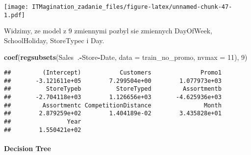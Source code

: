 \documentclass[]{article}
\newenvironment{Shaded}{\begin{snugshade}}{\end{snugshade}}
\newcommand{\DataTypeTok}[1]{\textcolor[rgb]{0.13,0.29,0.53}{#1}}
\newcommand{\DecValTok}[1]{\textcolor[rgb]{0.00,0.00,0.81}{#1}}
\newcommand{\KeywordTok}[1]{\textcolor[rgb]{0.13,0.29,0.53}{\textbf{#1}}}
\newcommand{\NormalTok}[1]{#1}
\newcommand{\OperatorTok}[1]{\textcolor[rgb]{0.81,0.36,0.00}{\textbf{#1}}}
\newcommand{\StringTok}[1]{\textcolor[rgb]{0.31,0.60,0.02}{#1}}
\let\oldparagraph\paragraph
\renewcommand{\paragraph}[1]{\oldparagraph{#1}\mbox{}}
\begin{document}
\begin{Shaded}
\end{Shaded}

\texttt{[image: ITMagination\_zadanie\_files/figure-latex/unnamed-chunk-47-1.pdf]}

Widzimy, ze model z 9 zmiennymi pozbyl sie zmiennych DayOfWeek,
SchoolHoliday, StoreTypec i Day.

\begin{Shaded}
\begin{Highlighting}[]
\KeywordTok{coef}\NormalTok{(}\KeywordTok{regsubsets}\NormalTok{(Sales}\OperatorTok{~}\NormalTok{.}\OperatorTok{-}\NormalTok{Store}\OperatorTok{-}\NormalTok{Date, }\DataTypeTok{data =}\NormalTok{ train_no_promo, }\DataTypeTok{nvmax =} \DecValTok{11}\NormalTok{), }\DecValTok{9}\NormalTok{)}
\end{Highlighting}
\end{Shaded}

\begin{verbatim}
##         (Intercept)           Customers              Promo1 
##       -3.121611e+05        7.299504e+00        1.077973e+03 
##          StoreTypeb          StoreTyped         Assortmentb 
##       -2.704118e+03        1.126656e+03       -4.625936e+03 
##         Assortmentc CompetitionDistance               Month 
##        2.879259e+02        1.404189e-02        3.435828e+01 
##                Year 
##        1.550421e+02
\end{verbatim}

\hypertarget{decision-tree}{%
\paragraph{Decision Tree}\label{decision-tree}}
\end{document}

